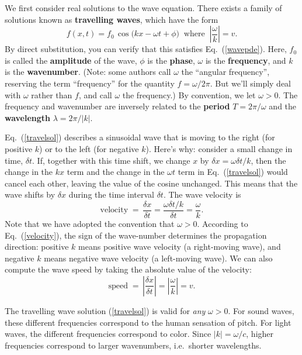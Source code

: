 \documentclass[10pt,a4paper]{article}
\begin{document}
We first consider real solutions to the wave equation. There exists a
family of solutions known as \textbf{travelling waves}, which have the
form
\begin{equation}
  f(x,t) = f_0 \, \cos\big(kx - \omega t + \phi\big)\;\;\mathrm{where}\;\; \left|\frac{\omega}{k}\right| = v.
  \label{travelsol}
\end{equation}
By direct substitution, you can verify that this satisfies
Eq.~(\ref{wavepde}).  Here, $f_0$ is called the \textbf{amplitude} of
the wave, $\phi$ is the \textbf{phase}, $\omega$ is the
\textbf{frequency}, and $k$ is the \textbf{wavenumber}. (Note: some
authors call $\omega$ the ``angular frequency'', reserving the term
``frequency'' for the quantity $f = \omega/2\pi$. But we'll simply
deal with $\omega$ rather than $f$, and call $\omega$ the frequency.)
By convention, we let $\omega > 0$. The frequency and wavenumber are
inversely related to the \textbf{period} $T = 2\pi/\omega$ and the
\textbf{wavelength} $\lambda = 2\pi/|k|$.

Eq.~(\ref{travelsol}) describes a sinusoidal wave that is moving to
the right (for positive $k$) or to the left (for negative $k$).
Here's why: consider a small change in time, $\delta t$. If, together
with this time shift, we change $x$ by $\delta x = \omega \delta t /
k$, then the change in the $kx$ term and the change in the $\omega t$
term in Eq.~(\ref{travelsol}) would cancel each other, leaving the
value of the cosine unchanged.  This means that the wave shifts by
$\delta x$ during the time interval $\delta t$.  The wave velocity is
\begin{equation}
  \textrm{velocity} \; = \, \frac{\delta x}{\delta t}
  = \frac{\omega \delta t / k}{\delta t} = \frac{\omega}{k}.
  \label{velocity}
\end{equation}
Note that we have adopted the convention that $\omega > 0$.  According
to Eq.~(\ref{velocity}), the sign of the wave-number determines the
propagation direction: positive $k$ means positive wave velocity (a
right-moving wave), and negative $k$ means negative wave velocity (a
left-moving wave). We can also compute the wave speed by taking the
absolute value of the velocity:
\begin{equation}
  \textrm{speed}\; = \, \left|\frac{\delta x}{\delta t}\right|
  = \left|\frac{\omega}{k}\right| = v.
\end{equation}

The travelling wave solution (\ref{travelsol}) is valid for \emph{any}
$\omega > 0$. For sound waves, these different frequencies correspond
to the human sensation of pitch. For light waves, the different
frequencies correspond to color. Since $|k| = \omega/c$, higher
frequencies correspond to larger wavenumbers, i.e.~shorter
wavelengths.
\end{document}
